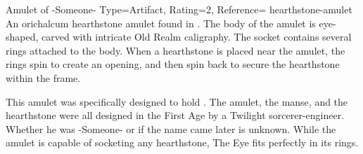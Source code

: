 ﻿


\begin{Merit}{Amulet of -Someone-}{%
    Type=Artifact,
    Rating=2,
    Reference=\cite*[p.~159]{ex3}
}{hearthstone-amulet}
    An orichalcum hearthstone amulet found in .
    The body of the amulet is eye-shaped, carved with intricate Old Realm
    caligraphy. The socket contains several rings attached to the body. When a
    hearthstone is placed near the amulet, the rings spin to create an opening,
    and then spin back to secure the hearthstone within the frame.

    This amulet was specifically designed to hold
    . The amulet, the manse, and the
    hearthstone were all designed in the First Age by a Twilight
    sorcerer-engineer. Whether he was -Someone- or if the name came later is
    unknown. While the amulet is capable of socketing any hearthstone, The Eye
    fits perfectly in its rings.

\end{Merit}


